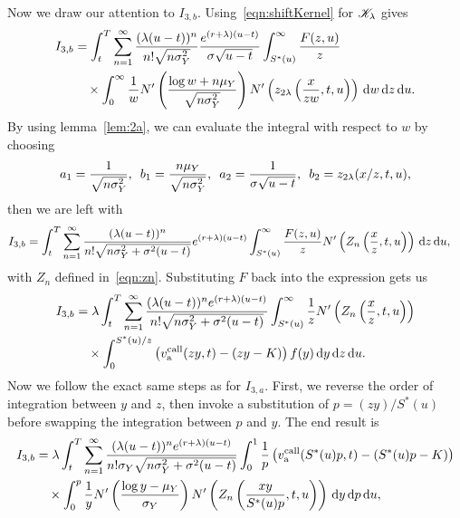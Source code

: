 		Now we draw our attention to $I_{3,b}$. Using~\eqref{eqn:shiftKernel} for $\mathscr K_\lambda$ gives
		\begin{align*}
			I_{3,b} &= \int_t^T \displaystyle\sum\limits_{n=1}^{\infty} \frac{(\lambda(u-t))^n}{n!\sqrt{n\sigma_Y^2}}\frac{e^{(r+\lambda)(u-t)}}{\sigma\sqrt{u-t}} \int_{S^*(u)}^\infty \frac{F(z,u)}{z}  \\
			&\quad {} \times \int_0^\infty  \frac{1}{w}N'\left( \frac{\log w + n\mu_Y}{\sqrt{n\sigma_Y^2}} \right)N'\left( z_{2\lambda}\left( \frac{x}{zw},t,u \right) \right) \, \mathrm d w \, \mathrm d z \, \mathrm d u.
		\end{align*}
		By using lemma~\ref{lem:2a}, we can evaluate the integral with respect to $w$ by choosing
		$$
			a_1 = \frac{1}{\sqrt{n\sigma_Y^2}}, \enskip b_1 = \frac{n\mu_Y}{\sqrt{n\sigma_Y^2}}, \enskip a_2 = \frac{1}{\sigma\sqrt{u-t}}, \enskip b_2 = z_{2\lambda}(x/z,t,u),
		$$
		then we are left with
		\begin{align*}
			I_{3,b} &= \int_t^T \displaystyle\sum\limits_{n=1}^{\infty} \frac{(\lambda(u-t))^n}{n!\sqrt{n\sigma_Y^2 + \sigma^2(u-t)}}e^{(r+\lambda)(u-t)}\int_{S^*(u)}^\infty \frac{F(z,u)}{z}  N'\left( Z_n\left( \frac{x}{z},t, u \right) \right)  \, \mathrm d z \, \mathrm d u,
		\end{align*}
		with $Z_n$ defined in~\eqref{eqn:zn}. Substituting $F$ back into the expression gets us
		\begin{align*}
			I_{3,b} &= \lambda \int_t^T \displaystyle\sum\limits_{n=1}^{\infty} \frac{(\lambda(u-t))^ne^{(r+\lambda)(u-t)}}{n!\sqrt{n\sigma_Y^2 + \sigma^2(u-t)}}\int_{S^*(u)}^\infty \frac{1}{z}  N'\left( Z_n\left( \frac{x}{z},t, u \right) \right) \\
			&\quad {} \times \int_0^{S^*(u)/z} \left( v_{\text{a}}^{\text{call}}(zy,t) - (zy-K) \right) f(y) \, \mathrm d y  \, \mathrm d z \, \mathrm d u.
		\end{align*}
		Now we follow the exact same steps as for $I_{3,a}$. First, we reverse the order of integration between $y$ and $z$, then invoke a substitution of $p = (zy)/S^*(u)$ before swapping the integration between $p$ and $y$. The end result is
		\begin{align*}
			I_{3,b} &= \lambda \int_t^T \displaystyle\sum\limits_{n=1}^{\infty} \frac{(\lambda(u-t))^ne^{(r+\lambda)(u-t)}}{n!\sigma_Y\sqrt{n\sigma_Y^2 + \sigma^2(u-t)}}\int_0^1 \frac{1}{p}\left( v_{\text{a}}^{\text{call}}(S^*(u)p,t) - (S^*(u)p - K) \right) \\
			&\quad {} \times \int_0^p \frac{1}{y} N'\left( \frac{\log y - \mu_Y}{\sigma_Y} \right) N'\left( Z_n\left( \frac{xy}{S^*(u)p}, t, u \right) \right)\, \mathrm d y  \, \mathrm d p \, \mathrm d u,
		\end{align*}

